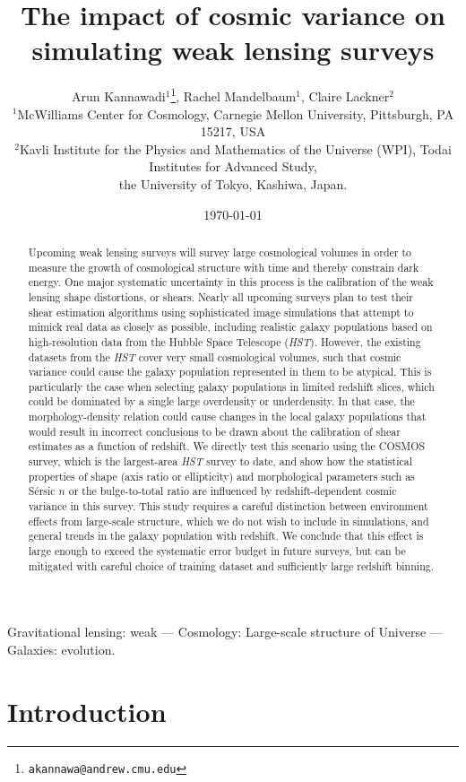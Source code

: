 \documentclass[twocolumn,useAMS,usenatbib]{mn2e}
\title[Cosmic variance in simulations]{The impact of cosmic variance on simulating weak lensing surveys}
\author[Kannawadi et al.]
{Arun Kannawadi$^1$\thanks{\tt akannawa@andrew.cmu.edu}, 
Rachel Mandelbaum$^1$,
Claire Lackner$^2$
\\$^1$McWilliams Center for Cosmology, Carnegie Mellon University, Pittsburgh, PA 15217, USA
\\$^2$Kavli Institute for the Physics and Mathematics of the Universe (WPI), Todai Institutes for Advanced Study,\\ the University of Tokyo, Kashiwa, Japan.
}
\date{\today}
\newcommand{\sersicn}{S\'{e}rsic $n$ }
\begin{document}

\maketitle

\begin{abstract}
Upcoming weak lensing surveys will survey large cosmological volumes
in order to measure the growth of cosmological structure with time and
thereby constrain dark energy.  One major systematic uncertainty in
this process is the calibration of the weak lensing shape distortions,
or shears.  Nearly all upcoming surveys plan to test their shear
estimation algorithms using sophisticated image simulations that
attempt to mimick real data as closely as possible, including
realistic galaxy populations based on high-resolution data from the
Hubble Space Telescope ({\em HST}).  However, the existing datasets
from the {\em HST} cover very small cosmological volumes, such that
cosmic variance could cause the galaxy population represented in them
to be atypical.  This is particularly the case when selecting galaxy
populations in limited redshift slices, which could be dominated by a
single large overdensity or underdensity.  In that case, the
morphology-density relation could cause changes in the local galaxy
populations that would result in incorrect conclusions to be drawn
about the calibration of shear estimates as a function of redshift.
We directly test this scenario using the COSMOS survey, which is the
largest-area {\em HST} survey to date, and show how the
statistical properties of shape (axis ratio or ellipticity) and
morphological parameters such as \sersicn or the bulge-to-total ratio
are influenced by redshift-dependent cosmic variance in this survey. This
study requires a careful distinction between environment effects from
large-scale structure, which we do not wish to include in simulations,
and general trends in the galaxy population with redshift. We conclude
that this effect is large enough to exceed the systematic error budget
in future surveys, but can be mitigated with careful choice of
training dataset and sufficiently large redshift binning. 
\end{abstract}

\begin{keywords}
 Gravitational lensing: weak --- Cosmology: Large-scale structure of Universe --- Galaxies: evolution.
\end{keywords}


\section{Introduction}
\label{S:intro}
\end{document}
